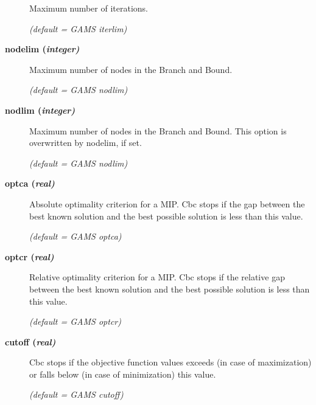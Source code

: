 \begin{description}
Maximum number of iterations.

\textsl{(default = GAMS iterlim)}

\item[\label{nodelim}\hypertarget{nodelim}
{\textbf{nodelim (\slshape{integer})}}]\hspace{1.0in}

Maximum number of nodes in the Branch and Bound.

\textsl{(default = GAMS nodlim)}

\item[\label{nodlim}\hypertarget{nodlim}
{\textbf{nodlim (\slshape{integer})}}]\hspace{1.0in}

Maximum number of nodes in the Branch and Bound.
This option is overwritten by nodelim, if set.

\textsl{(default = GAMS nodlim)}

\item[\label{optca}\hypertarget{optca}
{\textbf{optca (\slshape{real})}}]\hspace{1.0in}

Absolute optimality criterion for a MIP.
Cbc stops if the gap between the best known solution and the best possible solution is less than this value.

\textsl{(default = GAMS optca)}

\item[\label{optcr}\hypertarget{optcr}
{\textbf{optcr (\slshape{real})}}]\hspace{1.0in}

Relative optimality criterion for a MIP.
Cbc stops if the relative gap between the best known solution and the best possible solution is less than this value.

\textsl{(default = GAMS optcr)}

\item[\label{cutoff}\hypertarget{cutoff}
{\textbf{cutoff (\slshape{real})}}]\hspace{1.0in}

Cbc stops if the objective function values exceeds (in case of maximization) or falls below (in case of minimization) this value.

\textsl{(default = GAMS cutoff)}
\end{description}
